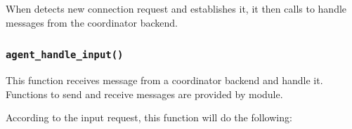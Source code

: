   When  detects new connection request and establishes
  it, it then calls  to handle messages from
  the coordinator backend.



\subsubsection*{\texttt{agent\_handle\_input()}} %

  This function receives message from a coordinator backend and handle it.
  Functions to send and receive messages are provided by  module.
  
  According to the input request, this function will do the following:
  

